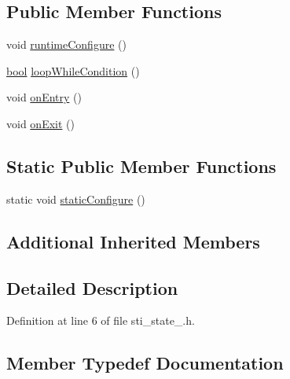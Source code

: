 \subsection*{Public Member Functions}
\begin{DoxyCompactItemize}
\item 
void \hyperlink{structsm__ferrari_1_1inner__states_1_1StiState1_ab7b8160481f81f821d960ebb167734cc}{runtime\+Configure} ()
\item 
\hyperlink{classbool}{bool} \hyperlink{structsm__ferrari_1_1inner__states_1_1StiState1_a6ffaddc2045557b0382fdcfde4628a08}{loop\+While\+Condition} ()
\item 
void \hyperlink{structsm__ferrari_1_1inner__states_1_1StiState1_ab9fc82e0e28d198180fa5ade750a9131}{on\+Entry} ()
\item 
void \hyperlink{structsm__ferrari_1_1inner__states_1_1StiState1_acaaf68eb35fa368ca08f9b47e4b8c46e}{on\+Exit} ()
\end{DoxyCompactItemize}
\subsection*{Static Public Member Functions}
\begin{DoxyCompactItemize}
\item 
static void \hyperlink{structsm__ferrari_1_1inner__states_1_1StiState1_afc56be47f929630c2d02070b83790829}{static\+Configure} ()
\end{DoxyCompactItemize}
\subsection*{Additional Inherited Members}


\subsection{Detailed Description}


Definition at line 6 of file sti\+\_\+state\+\_.\+h.



\subsection{Member Typedef Documentation}
\mbox{\label{structsm__ferrari_1_1inner__states_1_1StiState1_aa7e9f074031e748f9f1a66a45399cc10}} 

